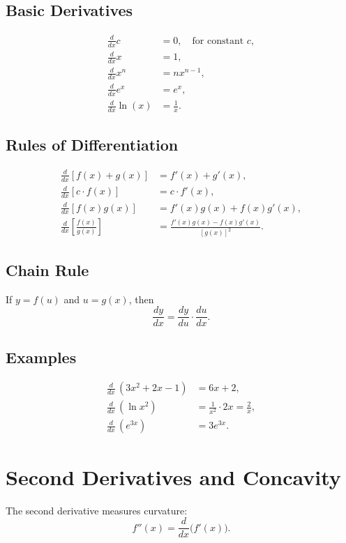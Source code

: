 \documentclass[11pt,letterpaper]{article}
\begin{document}
\subsection*{Basic Derivatives}
\begin{align*}
\frac{d}{dx} c &= 0, \quad \text{for constant } c, \\
\frac{d}{dx} x &= 1, \\
\frac{d}{dx} x^n &= n x^{n-1}, \\
\frac{d}{dx} e^x &= e^x, \\
\frac{d}{dx} \ln(x) &= \frac{1}{x}.
\end{align*}

\subsection*{Rules of Differentiation}
\begin{align*}
\frac{d}{dx}[f(x) + g(x)] &= f'(x) + g'(x), \\
\frac{d}{dx}[c \cdot f(x)] &= c \cdot f'(x), \\
\frac{d}{dx}[f(x)g(x)] &= f'(x) g(x) + f(x) g'(x), \\
\frac{d}{dx}\!\left[\frac{f(x)}{g(x)}\right] &= \frac{f'(x) g(x) - f(x) g'(x)}{[g(x)]^2}.
\end{align*}

\subsection*{Chain Rule}
If $y = f(u)$ and $u = g(x)$, then
\[
\frac{dy}{dx} = \frac{dy}{du} \cdot \frac{du}{dx}.
\]

\subsection*{Examples}
\begin{align*}
\frac{d}{dx}\,(3x^2 + 2x - 1) &= 6x + 2, \\
\frac{d}{dx}\,(\ln x^2) &= \frac{1}{x^2}\cdot 2x = \frac{2}{x}, \\
\frac{d}{dx}\,(e^{3x}) &= 3e^{3x}.
\end{align*}

\section*{Second Derivatives and Concavity}

The second derivative measures curvature:
\[
f''(x) = \frac{d}{dx} \big(f'(x)\big).
\]
\end{document}
